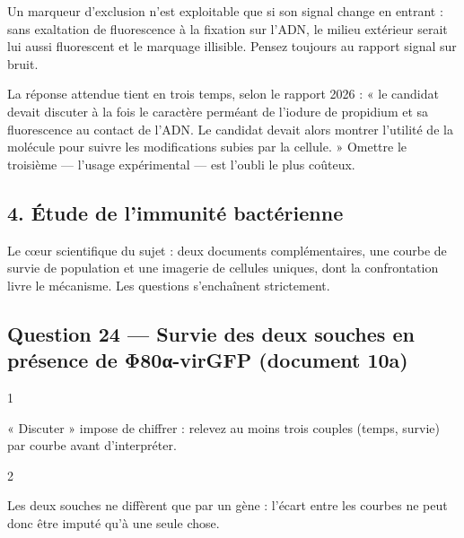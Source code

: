 \documentclass[11pt,a4paper]{article}
\begin{document}
\begin{methode}

Un marqueur d'exclusion n'est exploitable que si son signal change en entrant : sans exaltation de fluorescence à la fixation sur l'ADN, le milieu extérieur serait lui aussi fluorescent et le marquage illisible. Pensez toujours au rapport signal sur bruit.

\end{methode}

\begin{jury}

La réponse attendue tient en trois temps, selon le rapport 2026 : « le candidat devait discuter à la fois le caractère perméant de l'iodure de propidium et sa fluorescence au contact de l'ADN. Le candidat devait alors montrer l'utilité de la molécule pour suivre les modifications subies par la cellule. » Omettre le troisième --- l'usage expérimental --- est l'oubli le plus coûteux.

\end{jury}

\hypertarget{uxe9tude-de-limmunituxe9-bactuxe9rienne}{%
\subsection{4. Étude de l'immunité bactérienne}\label{uxe9tude-de-limmunituxe9-bactuxe9rienne}}

Le cœur scientifique du sujet : deux documents complémentaires, une courbe de survie de population et une imagerie de cellules uniques, dont la confrontation livre le mécanisme. Les questions s'enchaînent strictement.

\hypertarget{question-24-survie-des-deux-souches-en-pruxe9sence-de-ux3c680ux3b1-virgfp-document-10a}{%
\subsection{Question 24 --- Survie des deux souches en présence de Φ80α-virGFP (document 10a)}\label{question-24-survie-des-deux-souches-en-pruxe9sence-de-ux3c680ux3b1-virgfp-document-10a}}

\begin{indication}{1}

« Discuter » impose de chiffrer : relevez au moins trois couples (temps, survie) par courbe avant d'interpréter.

\end{indication}

\begin{indication}{2}

Les deux souches ne diffèrent que par un gène : l'écart entre les courbes ne peut donc être imputé qu'à une seule chose.

\end{indication}
\end{document}
